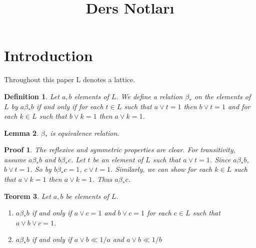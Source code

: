 \documentclass[a4paper,12pt]{article}
\title{Ders Notları}
\date{}
\numberwithin{equation}{section}
\theoremstyle{italik}
\newtheorem{teorem}{Teorem}[section]
\newtheorem{lemma}[teorem]{Lemma}
\newtheorem{tanim}[teorem]{Definition}
\newtheorem*{ispat}{Proof}
\begin{document}
\section{Introduction}
Throughout this paper L denotes a lattice.

\begin{tanim} \label{1}
  Let $ a,b $ elements of $ L $. We define a relation $ \beta_* $ on the elements of $ L $ by 
  $ a \beta_* b $ if and only if for each $ t \in L $ such that $ a \vee t = 1 $ then $ b \vee t = 1 $ and for each 
  $ k \in L $ such that $ b \vee k = 1 $ then $ a \vee k = 1 $.
\end{tanim}

\begin{lemma} \label{2}
  $ \beta_* $ is equivalence relation.
\end{lemma}
\begin{ispat}
  The reflexive and symmetric properties are clear. For transitivity, assume $ a \beta_*b $ and $ b \beta_* c $. Let 
  $ t $ be an element of $ L $ such that $ a \vee t = 1 $. Since $ a \beta_*b $, $ b \vee t = 1 $. So by $ b \beta_* c = 1 $, 
  $ c \vee t = 1 $. Similarly, we can show for each $ k \in L $ such that $ a \vee k = 1 $ then $ a \vee k=1 $. 
  Thus $ a \beta_* c $.

\end{ispat}

\begin{teorem} \label{3}
  Let $ a,b $ be elements of $ L $. 
  \begin{enumerate}[label=(\roman{*}), ref=(\roman{*})]

      \item
          $ a \beta_* b $ if and only if $ a \vee c = 1 $ and $ b \vee c = 1 $ for each $ c \in L $ 
      such that $ a \vee b  \vee c = 1 $.  \label{3.1}

    \item
      $ a \beta_* b $ if and only if $ a \vee b \ll 1/a $ and $ a \vee b \ll 1/b $  \label{3.2}

  \end{enumerate}
\end{teorem}
\end{document}
